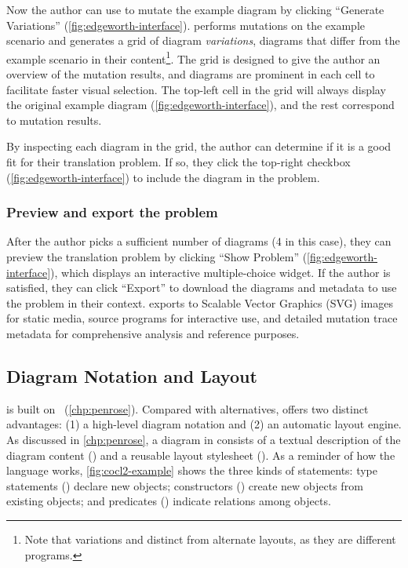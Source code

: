 Now the author can use \Edgeworth to mutate the example diagram by clicking ``Generate Variations'' (\cref{fig:edgeworth-interface}). \Edgeworth performs mutations on the example scenario and generates a grid of diagram \textit{variations}, \ie diagrams that differ from the example scenario in their content\footnote{Note that variations and distinct from alternate layouts, as they are different \Substance programs.}. The grid is designed to give the author an overview of the mutation results, and diagrams are prominent in each cell to facilitate faster visual selection. The top-left cell in the grid will always display the original example diagram (\cref{fig:edgeworth-interface}), and the rest correspond to mutation results.

By inspecting each diagram in the grid, the author can determine if it is a good fit for their translation problem. If so, they click the top-right checkbox (\cref{fig:edgeworth-interface}) to include the diagram in the problem.

\subsubsection{Preview and export the problem}
After the author picks a sufficient number of diagrams (4 in this case), they can preview the translation problem by clicking ``Show Problem'' (\cref{fig:edgeworth-interface}), which displays an interactive multiple-choice widget. If the author is satisfied, they can click ``Export'' to download the diagrams and metadata to use the problem in their context. \Edgeworth exports to Scalable Vector Graphics (SVG) images for static media, source programs for interactive use, and detailed mutation trace metadata for comprehensive analysis and reference purposes.

\subsection{Diagram Notation and Layout}
\label{sec:edgeworth-layout}

\Edgeworth is built on \Penrose~(\cref{chp:penrose}). Compared with alternatives, \Penrose offers two distinct advantages: (1) a high-level diagram notation and (2) an automatic layout engine. As discussed in \cref{chp:penrose}, a diagram in \Penrose consists of a textual description of the diagram content (\Substance) and a reusable layout stylesheet (\Style). As a reminder of how the \Substance language works, \cref{fig:cocl2-example} shows the three kinds of \Substance statements: type statements (\eg {}) declare new objects; constructors () create new objects from existing objects; and predicates () indicate relations among objects. 


